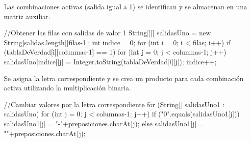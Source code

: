 Las combinaciones activas (salida igual a 1) se identifican y se almacenan en una matriz auxiliar.
\begin{javaCode}
//Obtener las filas con salidas de valor 1
String[][] salidasUno = new String[salidas.length][filas-1];
int indice = 0;
for (int i = 0; i < filas; i++) {
    if (tablaDeVerdad[i][columnas-1] == 1) {
        for (int j = 0; j < columnas-1; j++) {
            salidasUno[indice][j] = 
            Integer.toString(tablaDeVerdad[i][j]);
        }
        indice++;
    }
}
\end{javaCode}

Se asigna la letra correspondiente y se crea un producto para cada combinación activa utilizando la multiplicación binaria.
\begin{javaCode}
//Cambiar valores por la letra correspondiente
    for (String[] salidasUno1 : salidasUno) {
        for (int j = 0; j < columnas-1; j++) {
            if ("0".equals(salidasUno1[j])) {
                salidasUno1[j] = "-"+preposiciones.charAt(j);
            } else {
                salidasUno1[j] = ""+preposiciones.charAt(j);
            }
        }
    }
\end{javaCode}

